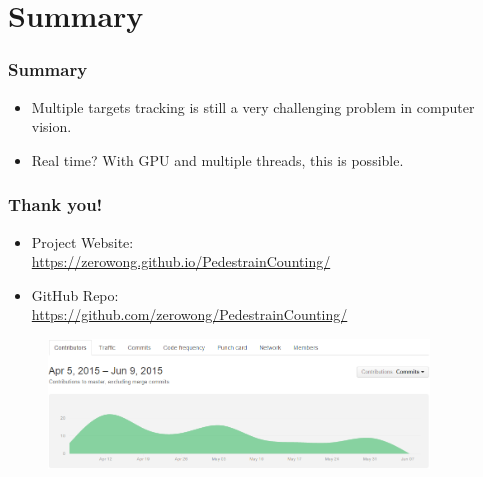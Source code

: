 \documentclass{beamer}
\begin{document}
\section{Summary}
\begin{frame}
	\frametitle{Summary}
	\begin{itemize}
		\item Multiple targets tracking is still a very challenging problem in computer vision.
		\item Real time? With GPU and multiple threads, this is possible.
	\end{itemize}
\end{frame}

% 
% 

\begin{frame}
	\frametitle{Thank you!}
	\begin{itemize}
		\item Project Website:\\
		\href{https://zerowong.github.io/PedestrainCounting/}{https://zerowong.github.io/PedestrainCounting/}
		\item GitHub Repo:\\
		\href{https://github.com/zerowong/PedestrainCounting}{https://github.com/zerowong/PedestrainCounting/}
	\end{itemize}
	\begin{figure}
		\begin{center}
			\includegraphics[width=0.9\textwidth]{images/git.png}
		\end{center}
	\end{figure}
\end{frame}
\end{document}

